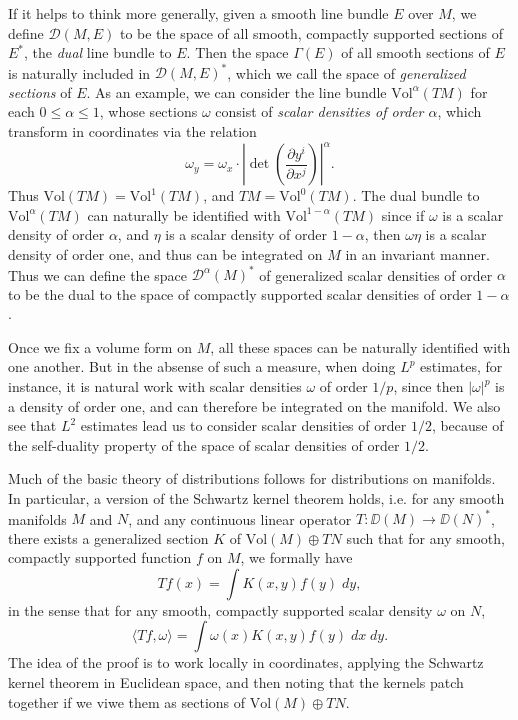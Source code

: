 \begin{remark} 
    If it helps to think more generally, given a smooth line bundle $E$ over $M$, we define $\mathcal{D}(M,E)$ to be the space of all smooth, compactly supported sections of $E^*$, the \emph{dual} line bundle to $E$. Then the space $\Gamma(E)$ of all smooth sections of $E$ is naturally included in $\mathcal{D}(M,E)^*$, which we call the space of \emph{generalized sections} of $E$. As an example, we can consider the line bundle $\text{Vol}^\alpha(TM)$ for each $0 \leq \alpha \leq 1$, whose sections $\omega$ consist of \emph{scalar densities of order $\alpha$}, which transform in coordinates via the relation
    \[ \omega_y = \omega_x \cdot \left| \det \left( \frac{\partial y^i}{\partial x^j} \right) \right|^\alpha. \]
    Thus $\text{Vol}(TM) = \text{Vol}^1(TM)$, and $TM = \text{Vol}^0(TM)$. The dual bundle to $\text{Vol}^\alpha(TM)$ can naturally be identified with $\text{Vol}^{1-\alpha}(TM)$ since if $\omega$ is a scalar density of order $\alpha$, and $\eta$ is a scalar density of order $1 - \alpha$, then $\omega \eta$ is a scalar density of order one, and thus can be integrated on $M$ in an invariant manner. Thus we can define the space $\mathcal{D}^\alpha(M)^*$ of generalized scalar densities of order $\alpha$ to be the dual to the space of compactly supported scalar densities of order $1 - \alpha$.

    Once we fix a volume form on $M$, all these spaces can be naturally identified with one another. But in the absense of such a measure, when doing $L^p$ estimates, for instance, it is natural work with scalar densities $\omega$ of order $1/p$, since then $|\omega|^p$ is a density of order one, and can therefore be integrated on the manifold. We also see that $L^2$ estimates lead us to consider scalar densities of order $1/2$, because of the self-duality property of the space of scalar densities of order $1/2$.
\end{remark}

Much of the basic theory of distributions follows for distributions on manifolds. In particular, a version of the Schwartz kernel theorem holds, i.e. for any smooth manifolds $M$ and $N$, and any continuous linear operator $T: \DD(M) \to \DD(N)^*$, there exists a generalized section $K$ of $\text{Vol}(M) \oplus TN$ such that for any smooth, compactly supported function $f$ on $M$, we formally have
%
\[ Tf(x) = \int K(x,y) f(y)\; dy, \]
%
in the sense that for any smooth, compactly supported scalar density $\omega$ on $N$,
%
\[ \langle Tf, \omega \rangle = \int \omega(x) K(x,y) f(y)\; dx\; dy. \]
%
The idea of the proof is to work locally in coordinates, applying the Schwartz kernel theorem in Euclidean space, and then noting that the kernels patch together if we viwe them as sections of $\text{Vol}(M) \oplus TN$.

